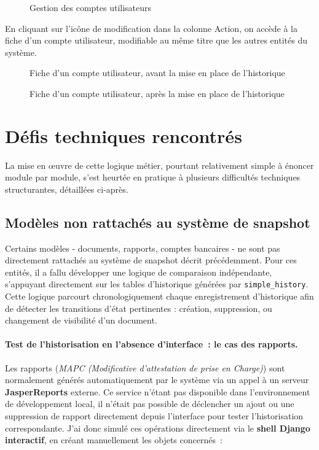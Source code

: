 \begin{figure}[H]
  \centering
  \caption{Gestion des comptes utilisateurs}
  \label{fig:gestion-comptes}
\end{figure}

En cliquant sur l'icône de modification dans la colonne \og{}Action\fg{},
on accède à la fiche d'un compte utilisateur, modifiable au même titre
que les autres entités du système.

\begin{figure}[H]
  \centering
  \caption{Fiche d'un compte utilisateur, avant la mise en place de
    l'historique}
  \label{fig:compte-avant}
\end{figure}

\begin{figure}[H]
  \centering
  \caption{Fiche d'un compte utilisateur, après la mise en place de
    l'historique}
  \label{fig:compte-apres}
\end{figure}


\section{Défis techniques rencontrés}

La mise en œuvre de cette logique métier, pourtant relativement simple à
énoncer module par module, s'est heurtée en pratique à plusieurs
difficultés techniques structurantes, détaillées ci-après.

\subsection{Modèles non rattachés au système de snapshot}

Certains modèles  -  documents, rapports, comptes bancaires  -  ne sont pas
directement rattachés au système de snapshot décrit précédemment. Pour
ces entités, il a fallu développer une logique de comparaison
indépendante, s'appuyant directement sur les tables d'historique
générées par \texttt{simple\_history}. Cette logique parcourt
chronologiquement chaque enregistrement d'historique afin de détecter les
transitions d'état pertinentes : création, suppression, ou changement de
visibilité d'un document.

\paragraph{Test de l'historisation en l'absence d'interface~: le cas des
rapports.} Les rapports (\textit{MAPC (Modificative d'attestation de prise en Charge)}) sont normalement générés
automatiquement par le système via un appel à un serveur
\textbf{JasperReports} externe. Ce service n'étant pas disponible dans
l'environnement de développement local, il n'était pas possible de
déclencher un ajout ou une suppression de rapport directement depuis
l'interface pour tester l'historisation correspondante. J'ai donc simulé
ces opérations directement via le \textbf{shell Django interactif}, en
créant manuellement les objets concernés~:

